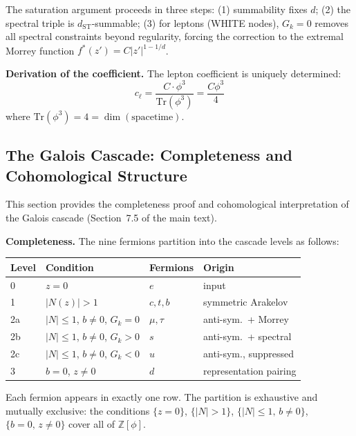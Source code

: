 \documentclass[12pt,a4paper]{article}
\theoremstyle{definition}
\begin{document}
The saturation argument proceeds in three steps: (1) summability fixes $d$; (2) the spectral triple is $d_{\text{ST}}$-summable; (3) for leptons (WHITE nodes), $G_k = 0$ removes all spectral constraints beyond regularity, forcing the correction to the extremal Morrey function $f^*(z') = C|z'|^{1-1/d}$.

\textbf{Derivation of the coefficient.} The lepton coefficient is uniquely determined:
\begin{equation}
c_\ell = \frac{C \cdot \phi^3}{\mathrm{Tr}(\phi^3)} = \frac{C \phi^3}{4}
\end{equation}
where $\mathrm{Tr}(\phi^3) = 4 = \dim(\text{spacetime})$.

\subsection{The Galois Cascade: Completeness and Cohomological Structure}
\label{sec:S-galois-cascade}

This section provides the completeness proof and cohomological interpretation of the Galois cascade (Section~7.5 of the main text).

\textbf{Completeness.}  The nine fermions partition into the cascade levels as follows:
\begin{center}
\begin{tabular}{llll}
\toprule
\textbf{Level} & \textbf{Condition} & \textbf{Fermions} & \textbf{Origin} \\
\midrule
0 & $z = 0$ & $e$ & input \\
1 & $|N(z)| > 1$ & $c, t, b$ & symmetric Arakelov \\
2a & $|N| \leq 1$, $b \neq 0$, $G_k = 0$ & $\mu, \tau$ & anti-sym.\ + Morrey \\
2b & $|N| \leq 1$, $b \neq 0$, $G_k > 0$ & $s$ & anti-sym.\ + spectral \\
2c & $|N| \leq 1$, $b \neq 0$, $G_k < 0$ & $u$ & anti-sym., suppressed \\
3 & $b = 0$, $z \neq 0$ & $d$ & representation pairing \\
\bottomrule
\end{tabular}
\end{center}
Each fermion appears in exactly one row.  The partition is exhaustive and mutually exclusive: the conditions $\{z=0\}$, $\{|N|>1\}$, $\{|N|\leq 1,\, b\neq 0\}$, $\{b=0,\, z\neq 0\}$ cover all of $\mathbb{Z}[\phi]$.
\end{document}
